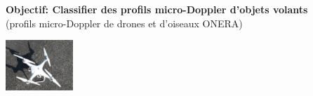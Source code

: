 \documentclass[a0,portrait]{a0poster}
\begin{document}
\begin{multicols}{2} %


\begin{tcolorbox}[colback=blue!5!lime,colframe=green!75!black,title={\section*{Contexte}}]
\textbf{\Large{Objectif: Classifier des profils micro-Doppler d'objets volants}}\\
(profils micro-Doppler de drones et d'oiseaux ONERA)
\begin{center}
    \includegraphics[width=0.19\textwidth]{./Phantom_version1.jpg}
\end{center}
\end{tcolorbox}
\bigskip



\end{multicols}
\end{document}
